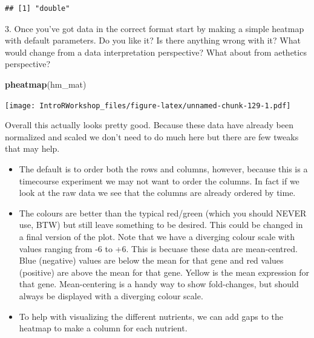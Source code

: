 \documentclass[
]{book}
\newenvironment{Shaded}{\begin{snugshade}}{\end{snugshade}}
\newcommand{\FunctionTok}[1]{\textcolor[rgb]{0.13,0.29,0.53}{\textbf{#1}}}
\newcommand{\NormalTok}[1]{#1}
\providecommand{\tightlist}{%
  \setlength{\itemsep}{0pt}\setlength{\parskip}{0pt}}
\begin{document}
\begin{verbatim}
## [1] "double"
\end{verbatim}

3. Once you've got data in the correct format start by making a simple heatmap with default parameters. Do you like it? Is there anything wrong with it? What would change from a data interpretation perspective? What about from aethetics perspective?

\begin{Shaded}
\begin{Highlighting}[]
\FunctionTok{pheatmap}\NormalTok{(hm\_mat)}
\end{Highlighting}
\end{Shaded}

\texttt{[image: IntroRWorkshop\_files/figure-latex/unnamed-chunk-129-1.pdf]}

Overall this actually looks pretty good. Because these data have already been normalized and scaled we don't need to do much here but there are few tweaks that may help.

\begin{itemize}
\tightlist
\item
  The default is to order both the rows and columns, however, because this is a timecourse experiment we may not want to order the columns. In fact if we look at the raw data we see that the columns are already ordered by time.
\item
  The colours are better than the typical red/green (which you should NEVER use, BTW) but still leave something to be desired. This could be changed in a final version of the plot. Note that we have a diverging colour scale with values ranging from -6 to +6. This is becuase these data are mean-centred. Blue (negative) values are below the mean for that gene and red values (positive) are above the mean for that gene. Yellow is the mean expression for that gene. Mean-centering is a handy way to show fold-changes, but should always be displayed with a diverging colour scale.
\item
  To help with visualizing the different nutrients, we can add gaps to the heatmap to make a column for each nutrient.
\end{itemize}
\end{document}
